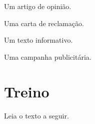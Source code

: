 \begin{multicols}{2}
\begin{escolha}
\item Um artigo de opinião.
\item Uma carta de reclamação. 
\item Um texto informativo.
\item Uma campanha publicitária.
\end{escolha}
\end{multicols}

\section*{Treino}

Leia o texto a seguir.


